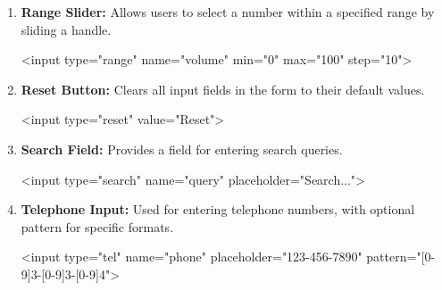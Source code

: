 \documentclass{report}
\begin{document}
\begin{itemize}
\begin{enumerate}
            \item \textbf{Range Slider:} Allows users to select a number within a specified range by sliding a handle.
                \bigbreak \noindent 
                \begin{htmlcode}
                    <input type="range" name="volume" min="0" max="100" step="10">
                \end{htmlcode}

            \item \textbf{Reset Button:} Clears all input fields in the form to their default values.
                \bigbreak \noindent 
                \begin{htmlcode}
                    <input type="reset" value="Reset">
                \end{htmlcode}

            \item \textbf{Search Field:} Provides a field for entering search queries.
                \bigbreak \noindent 
                \begin{htmlcode}
                    <input type="search" name="query" placeholder="Search...">
                \end{htmlcode}
                
            \item \textbf{Telephone Input:} Used for entering telephone numbers, with optional pattern for specific formats.
                \bigbreak \noindent 
                \begin{htmlcode}
                    <input type="tel" name="phone" placeholder="123-456-7890" pattern="[0-9]{3}-[0-9]{3}-[0-9]{4}">
                \end{htmlcode}


\end{enumerate}
\end{itemize}
\end{document}
